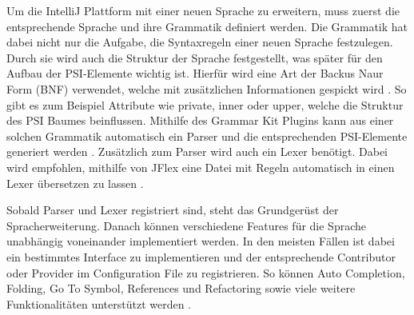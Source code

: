   Um die IntelliJ Plattform mit einer neuen Sprache zu erweitern, muss zuerst die entsprechende
  Sprache und ihre Grammatik definiert werden. Die Grammatik hat dabei nicht nur die Aufgabe, die 
  Syntaxregeln einer neuen Sprache festzulegen. Durch sie wird auch die Struktur der Sprache festgestellt,
  was später für den Aufbau der PSI-Elemente wichtig ist. Hierfür wird eine Art der Backus Naur Form (BNF)
  verwendet, welche mit zusätzlichen Informationen gespickt wird \cite{mccracken2003backus,GrammarKit}. 
  So gibt es zum Beispiel Attribute
  wie private, inner oder upper, welche die Struktur des PSI Baumes beinflussen. Mithilfe des Grammar Kit Plugins
  kann aus einer solchen Grammatik automatisch ein Parser und die entsprechenden PSI-Elemente generiert werden
  \cite{IntelliJPlatformSDKLanguageTutorialGrammar}. 
  Zusätzlich zum Parser wird auch ein Lexer benötigt. Dabei wird empfohlen, mithilfe von JFlex
  eine Datei mit Regeln automatisch in einen Lexer übersetzen zu lassen 
  \cite{JFlex,klein2010jflex,IntelliJPlatformSDKLanguageTutorialLexer}.

  Sobald Parser und Lexer registriert sind, steht das Grundgerüst der Spracherweiterung. Danach können
  verschiedene Features für die Sprache unabhängig voneinander implementiert werden. In den meisten
  Fällen ist dabei ein bestimmtes Interface zu implementieren und der entsprechende Contributor oder
  Provider im Configuration File zu registrieren. So können Auto Completion, Folding, Go To Symbol,
  References und Refactoring sowie viele weitere Funktionalitäten unterstützt werden
  \cite{IntelliJPlatformSDKCustomLanguageSupport,IntelliJPlatformSDKLanguageTutorial}.

